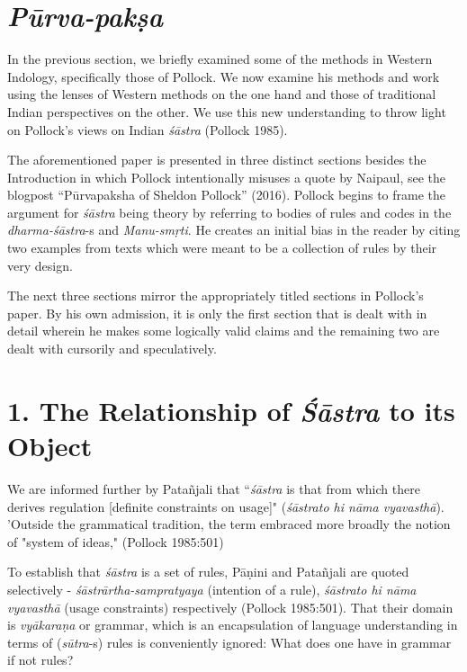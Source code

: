 \section*{{\sl\bfseries Pūrva-pakṣa}}

In the previous section, we briefly examined some of the methods in Western Indology, specifically those of Pollock.  We now examine his methods and work using the lenses of Western methods on the one hand and those of traditional Indian perspectives on the other. We use this new understanding to throw light on Pollock's views on Indian {\sl śāstra} (Pollock 1985).

The aforementioned paper is presented in three distinct sections besides the Introduction in which Pollock intentionally misuses a quote by Naipaul, see the blogpost ``Pūrvapaksha of Sheldon Pollock'' (2016). Pollock begins to frame the argument for {\sl śāstra} being theory by referring to bodies of rules and codes in the {\sl dharma-śāstra}-s and {\sl Manu-smṛti}. He creates an initial bias in the reader by citing two examples from texts which were meant to be a collection of rules by their very design.

The next three sections mirror the appropriately titled sections in Pollock's paper. By his own admission, it is only the first section that is dealt with in detail wherein he makes some logically valid claims and the remaining two are dealt with cursorily and speculatively.

\section*{1. The Relationship of {{\sl\bfseries Śāstra}\relax} to its Object}

We are informed further by Patañjali that  ``{\sl śāstra} is that from which there derives regulation [definite constraints on usage]" ({\sl śāstrato hi nāma vyavasthā}). 'Outside the grammatical tradition, the term embraced more broadly the notion of "system of ideas," (Pollock 1985:501)

To establish that {\sl śāstra} is a set of rules, Pāṇini and Patañjali are quoted selectively - {\sl śāstrārtha-sampratyaya} (intention of a rule), {\sl śāstrato hi nāma vyavasthā} (usage constraints) respectively (Pollock 1985:501). That their domain is {\sl vyākaraṇa} or grammar, which is an encapsulation of language understanding in terms of ({\sl sūtra}-s) rules is conveniently ignored: What does one have in grammar if not rules? 

